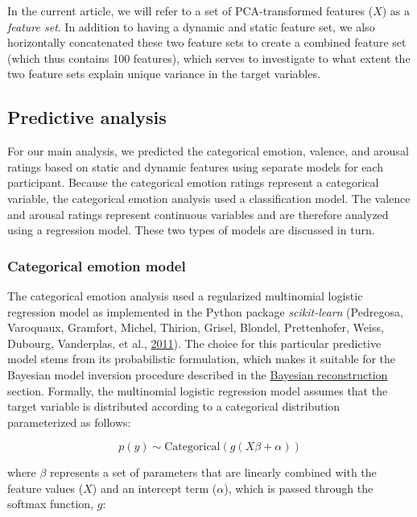 \documentclass[11pt,american,a4paper,oneside,]{memoir} %
\begin{document}
In the current article, we will refer to a set of PCA-transformed features (\(X\)) as a \emph{feature set}. In addition to having a dynamic and static feature set, we also horizontally concatenated these two feature sets to create a combined feature set (which thus contains 100 features), which serves to investigate to what extent the two feature sets explain unique variance in the target variables.

\hypertarget{svsd-pred-analysis}{%
\subsection{Predictive analysis}\label{svsd-pred-analysis}}

For our main analysis, we predicted the categorical emotion, valence, and arousal ratings based on static and dynamic features using separate models for each participant. Because the categorical emotion ratings represent a categorical variable, the categorical emotion analysis used a classification model. The valence and arousal ratings represent continuous variables and are therefore analyzed using a regression model. These two types of models are discussed in turn.

\hypertarget{svsd-cat-emo}{%
\subsubsection{Categorical emotion model}\label{svsd-cat-emo}}

The categorical emotion analysis used a regularized multinomial logistic regression model as implemented in the Python package \emph{scikit-learn} (Pedregosa, Varoquaux, Gramfort, Michel, Thirion, Grisel, Blondel, Prettenhofer, Weiss, Dubourg, Vanderplas, et al., \protect\hyperlink{ref-Pedregosa2011-bp}{2011}). The choice for this particular predictive model stems from its probabilistic formulation, which makes it suitable for the Bayesian model inversion procedure described in the \protect\hyperlink{svsd-bayes}{Bayesian reconstruction} section. Formally, the multinomial logistic regression model assumes that the target variable is distributed according to a categorical distribution parameterized as follows:

\begin{equation}
p(y) \sim \mathrm{Categorical}(g(X\beta + \alpha))
\end{equation}

where \(\beta\) represents a set of parameters that are linearly combined with the feature values (\(X\)) and an intercept term (\(\alpha\)), which is passed through the softmax function, \(g\):
\end{document}
